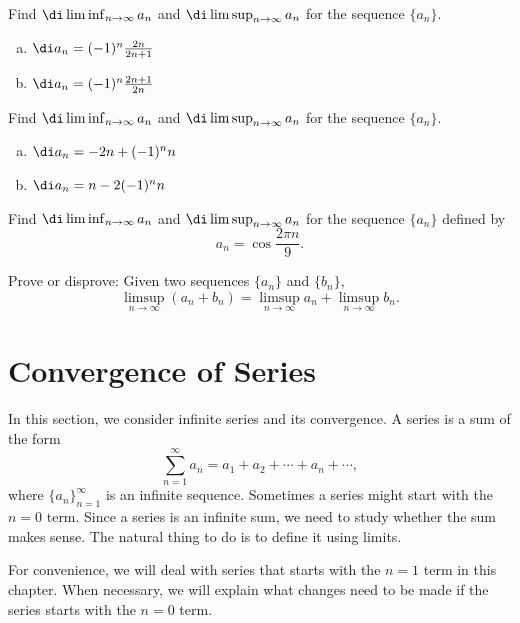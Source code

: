 \atc
 
 \begin{question}{\themyquestion}
Find $\di\liminf_{n\to\infty}a_n$ and $\di \limsup_{n\to \infty}a_n$ for the sequence $\{a_n\}$.
\begin{enumerate}[(a)]
\item $\di a_n=(-1)^n\frac{2n}{2n+1}$
\item $\di a_n=(-1)^n\frac{2n+1}{2n}$
\end{enumerate}
\end{question}

\atc
 
 \begin{question}{\themyquestion}
Find $\di\liminf_{n\to\infty}a_n$ and $\di \limsup_{n\to \infty}a_n$ for the sequence $\{a_n\}$.
\begin{enumerate}[(a)]
\item $\di a_n= -2n+(-1)^n n$
\item $\di a_n=n-2(-1)^n n$
\end{enumerate}
\end{question}

 

\atc
 \begin{question}{\themyquestion}
Find $\di\liminf_{n\to\infty}a_n$ and $\di \limsup_{n\to \infty}a_n$ for the sequence $\{a_n\}$   defined by
\[a_n=\cos\frac{2\pi n}{9}.\]
\end{question}

 
\atc
 \begin{question}{\themyquestion}
Prove or disprove: Given two sequences $\{a_n\}$ and $\{b_n\}$, 
\[\limsup_{n\to\infty}(a_n+ b_n)=\limsup_{n\to\infty}a_n+\limsup_{n\to\infty}b_n.\]
\end{question}
\vp

\section{Convergence of Series}\label{sec5.2}

In this section, we consider infinite series and its convergence. A series is a   sum of the form
\[\sum_{n=1}^{\infty}a_n=a_{1}+a_{2}+\cdots+a_n+\cdots,\]where $\{a_n\}_{n=1}^{\infty}$ is an infinite sequence.  Sometimes a series might start with the $n=0$ term.
Since a series is an infinite sum, we need to study whether the sum makes sense. The natural thing to do is to define it using limits.

For convenience, we will deal with series that starts with the $n=1$ term in this chapter. When necessary, we will explain what changes   need to be made if the series starts with the $n=0$ term.

